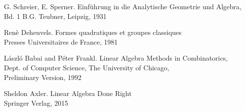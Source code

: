 \documentclass[]{amsart}
\begin{document}
\begin{thebibliography}{4}


G. Schreier, E. Sperner.
Einf\"uhrung in die Analytische Geometrie und Algebra,  \linebreak
Bd. 1
B.G. Teubner, Leipzig, 1931




Ren\`e Deheuvels.
Formes quadratiques et groupes classiques \\
Presses Universitaires de France, 1981


L\'aszl\'o Babai and 
P\'eter Frankl.
Linear Algebra Methods in Combinatorics,\\
Dept. of Computer Science, The University of Chicago,\\
Preliminary Version, 1992




Sheldon Axler.
Linear Algebra Done Right\\
Springer Verlag, 2015








\end{thebibliography}
\end{document}
